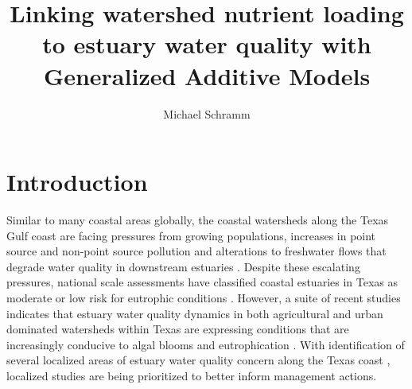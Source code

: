 \documentclass[fleqn,10pt,lineno]{wlpeerj} %
\title{Linking watershed nutrient loading to estuary water quality with
Generalized Additive Models}
\author[1]{Michael Schramm}
\affil[1]{Texas Water Resources Institute, Texas A\&M AgriLife Research,
College Station, Texas, United States}
\begin{document}
\flushbottom
\maketitle
\thispagestyle{empty}

\hypertarget{introduction}{%
\section*{Introduction}\label{introduction}}

Similar to many coastal areas globally, the coastal watersheds along the
Texas Gulf coast are facing pressures from growing populations,
increases in point source and non-point source pollution and alterations
to freshwater flows that degrade water quality in downstream estuaries
\autocite{bricker_effects_2008,kennicuttWaterQualityGulf2017,bugica_water_2020}.
Despite these escalating pressures, national scale assessments have
classified coastal estuaries in Texas as moderate or low risk for
eutrophic conditions \autocite{bricker_effects_2008}. However, a suite
of recent studies indicates that estuary water quality dynamics in both
agricultural and urban dominated watersheds within Texas are expressing
conditions that are increasingly conducive to algal blooms and
eutrophication
\autocite{wetzWaterQualityDynamics2016,wetz_exceptionally_2017,bugica_water_2020,chinPhytoplanktonBiomassCommunity2022}.
With identification of several localized areas of estuary water quality
concern along the Texas coast \autocite{bugica_water_2020}, localized
studies are being prioritized to better inform management actions.
\end{document}
